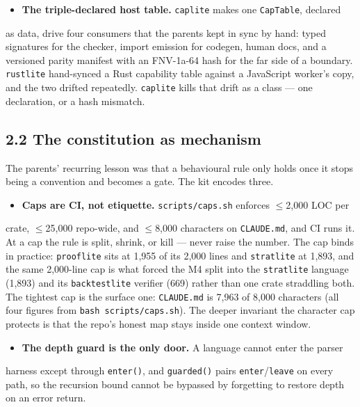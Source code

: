 \documentclass[11pt]{article}
\newcommand{\code}[1]{\texttt{#1}}
\begin{document}
\begin{itemize}[leftmargin=*]
\item \textbf{The triple-declared host table.} \code{caplite} makes one \code{CapTable}, declared
\end{itemize}
  as data, drive four consumers that the parents kept in sync by hand: typed
  signatures for the checker, import emission for codegen, human docs, and a
  versioned parity manifest with an FNV-1a-64 hash for the far side of a
  boundary. \code{rustlite} hand-synced a Rust capability table against a JavaScript
  worker's copy, and the two drifted repeatedly. \code{caplite} kills that drift as a
  class --- one declaration, or a hash mismatch.

\subsection*{2.2 The constitution as mechanism}

The parents' recurring lesson was that a behavioural rule only holds once it
stops being a convention and becomes a gate. The kit encodes three.

\begin{itemize}[leftmargin=*]
\item \textbf{Caps are CI, not etiquette.} \code{scripts/caps.sh} enforces $\le$2,000 LOC per
\end{itemize}
  crate, $\le$25,000 repo-wide, and $\le$8,000 characters on \code{CLAUDE.md}, and CI runs
  it. At a cap the rule is split, shrink, or kill --- never raise the number. The
  cap binds in practice: \code{prooflite} sits at 1,955 of its 2,000 lines and
  \code{stratlite} at 1,893, and the same 2,000-line cap is what forced the M4 split
  into the \code{stratlite} language (1,893) and its \code{backtestlite} verifier (669)
  rather than one crate straddling both. The tightest cap is the surface one:
  \code{CLAUDE.md} is 7,963 of 8,000 characters (all four figures from
  \code{bash scripts/caps.sh}). The deeper invariant the character cap protects is
  that the repo's honest map stays inside one context window.

\begin{itemize}[leftmargin=*]
\item \textbf{The depth guard is the only door.} A language cannot enter the parser
\end{itemize}
  harness except through \code{enter()}, and \code{guarded()} pairs \code{enter}/\code{leave} on
  every path, so the recursion bound cannot be bypassed by forgetting to
  restore depth on an error return.
\end{document}
